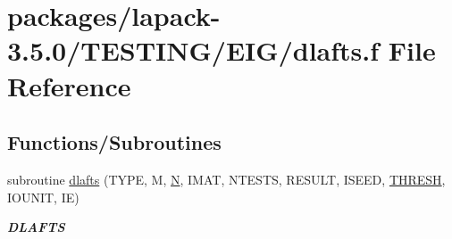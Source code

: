 \hypertarget{dlafts_8f}{}\section{packages/lapack-\/3.5.0/\+T\+E\+S\+T\+I\+N\+G/\+E\+I\+G/dlafts.f File Reference}
\label{dlafts_8f}
\subsection*{Functions/\+Subroutines}
\begin{DoxyCompactItemize}
\item 
subroutine \hyperlink{group__double__eig_ga6f9c26a927bb292ac5cab99adc1a357c}{dlafts} (T\+Y\+P\+E, M, \hyperlink{polmisc_8c_a0240ac851181b84ac374872dc5434ee4}{N}, I\+M\+A\+T, N\+T\+E\+S\+T\+S, R\+E\+S\+U\+L\+T, I\+S\+E\+E\+D, \hyperlink{zlaqgs_8c_a0656018abfc9fa2821827415f5d5ea57}{T\+H\+R\+E\+S\+H}, I\+O\+U\+N\+I\+T, I\+E)
\begin{DoxyCompactList}\small\item\em {\bfseries D\+L\+A\+F\+T\+S} \end{DoxyCompactList}\end{DoxyCompactItemize}
